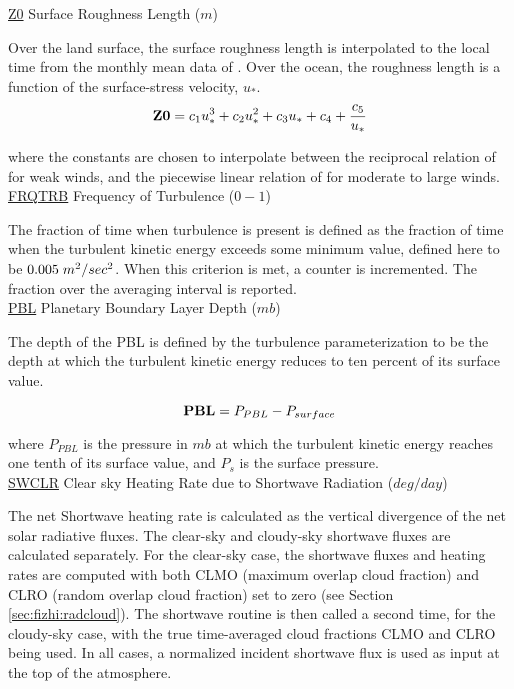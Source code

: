 \noindent
{ \underline {Z0}  Surface Roughness Length ($m$) }

\noindent
Over the land surface, the surface roughness length is interpolated to the local
time from the monthly mean data of \cite{dorsell:89}. Over the ocean,
the roughness length is a function of the surface-stress velocity, $u_*$.
\[
{\bf Z0} = c_1u^3_* + c_2u^2_* + c_3u_* + c_4 + {c_5 \over {u_*}}
\]

\noindent
where the constants are chosen to interpolate between the reciprocal relation of
\cite{kondo:75} for weak winds, and the piecewise linear relation of \cite{larpond:81}
for moderate to large winds.
\\
 
\noindent
{ \underline {FRQTRB}  Frequency of Turbulence ($0-1$) }

\noindent
The fraction of time when turbulence is present is defined as the fraction of
time when the turbulent kinetic energy exceeds some minimum value, defined here
to be $0.005 \hspace{.1cm}m^2/sec^2$. When this criterion is met, a counter is
incremented. The fraction over the averaging interval is reported.
\\
 
\noindent
{ \underline {PBL}  Planetary Boundary Layer Depth ($mb$) }

\noindent
The depth of the PBL is defined by the turbulence parameterization to be the
depth at which the turbulent kinetic energy reduces to ten percent of its surface
value.

\[
{\bf PBL} = P_{PBL} - P_{surface}
\]

\noindent
where $P_{PBL}$ is the pressure in $mb$ at which the turbulent kinetic energy
reaches one tenth of its surface value, and $P_s$ is the surface pressure.
\\
 
\noindent
{ \underline {SWCLR} Clear sky Heating Rate due to Shortwave Radiation ($deg/day$) }

\noindent
The net Shortwave heating rate is calculated as the vertical divergence of the
net solar radiative fluxes.
The clear-sky and cloudy-sky shortwave fluxes are calculated separately.
For the clear-sky case, the shortwave fluxes and heating rates are computed with
both CLMO (maximum overlap cloud fraction) and
CLRO (random overlap cloud fraction) set to zero (see Section \ref{sec:fizhi:radcloud}).
The shortwave routine is then called a second time, for the cloudy-sky case, with the
true time-averaged cloud fractions CLMO
and CLRO being used.  In all cases, a normalized incident shortwave flux is used as
input at the top of the atmosphere.

